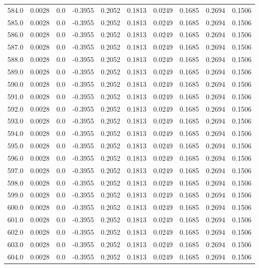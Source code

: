 \begin{longtable}{lrrrrrrrrr}
584.0 & 0.0028 & 0.0 & -0.3955 & 0.2052 & 0.1813 & 0.0249 & 0.1685 & 0.2694 & 0.1506 \\
585.0 & 0.0028 & 0.0 & -0.3955 & 0.2052 & 0.1813 & 0.0249 & 0.1685 & 0.2694 & 0.1506 \\
586.0 & 0.0028 & 0.0 & -0.3955 & 0.2052 & 0.1813 & 0.0249 & 0.1685 & 0.2694 & 0.1506 \\
587.0 & 0.0028 & 0.0 & -0.3955 & 0.2052 & 0.1813 & 0.0249 & 0.1685 & 0.2694 & 0.1506 \\
588.0 & 0.0028 & 0.0 & -0.3955 & 0.2052 & 0.1813 & 0.0249 & 0.1685 & 0.2694 & 0.1506 \\
589.0 & 0.0028 & 0.0 & -0.3955 & 0.2052 & 0.1813 & 0.0249 & 0.1685 & 0.2694 & 0.1506 \\
590.0 & 0.0028 & 0.0 & -0.3955 & 0.2052 & 0.1813 & 0.0249 & 0.1685 & 0.2694 & 0.1506 \\
591.0 & 0.0028 & 0.0 & -0.3955 & 0.2052 & 0.1813 & 0.0249 & 0.1685 & 0.2694 & 0.1506 \\
592.0 & 0.0028 & 0.0 & -0.3955 & 0.2052 & 0.1813 & 0.0249 & 0.1685 & 0.2694 & 0.1506 \\
593.0 & 0.0028 & 0.0 & -0.3955 & 0.2052 & 0.1813 & 0.0249 & 0.1685 & 0.2694 & 0.1506 \\
594.0 & 0.0028 & 0.0 & -0.3955 & 0.2052 & 0.1813 & 0.0249 & 0.1685 & 0.2694 & 0.1506 \\
595.0 & 0.0028 & 0.0 & -0.3955 & 0.2052 & 0.1813 & 0.0249 & 0.1685 & 0.2694 & 0.1506 \\
596.0 & 0.0028 & 0.0 & -0.3955 & 0.2052 & 0.1813 & 0.0249 & 0.1685 & 0.2694 & 0.1506 \\
597.0 & 0.0028 & 0.0 & -0.3955 & 0.2052 & 0.1813 & 0.0249 & 0.1685 & 0.2694 & 0.1506 \\
598.0 & 0.0028 & 0.0 & -0.3955 & 0.2052 & 0.1813 & 0.0249 & 0.1685 & 0.2694 & 0.1506 \\
599.0 & 0.0028 & 0.0 & -0.3955 & 0.2052 & 0.1813 & 0.0249 & 0.1685 & 0.2694 & 0.1506 \\
600.0 & 0.0028 & 0.0 & -0.3955 & 0.2052 & 0.1813 & 0.0249 & 0.1685 & 0.2694 & 0.1506 \\
601.0 & 0.0028 & 0.0 & -0.3955 & 0.2052 & 0.1813 & 0.0249 & 0.1685 & 0.2694 & 0.1506 \\
602.0 & 0.0028 & 0.0 & -0.3955 & 0.2052 & 0.1813 & 0.0249 & 0.1685 & 0.2694 & 0.1506 \\
603.0 & 0.0028 & 0.0 & -0.3955 & 0.2052 & 0.1813 & 0.0249 & 0.1685 & 0.2694 & 0.1506 \\
604.0 & 0.0028 & 0.0 & -0.3955 & 0.2052 & 0.1813 & 0.0249 & 0.1685 & 0.2694 & 0.1506 \\

\end{longtable}
